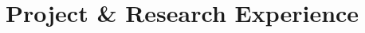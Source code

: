 \documentclass[11pt,a4paper,nolmodern]{moderncv}
\begin{document}






\section{Project \& Research Experience}
\end{document}
